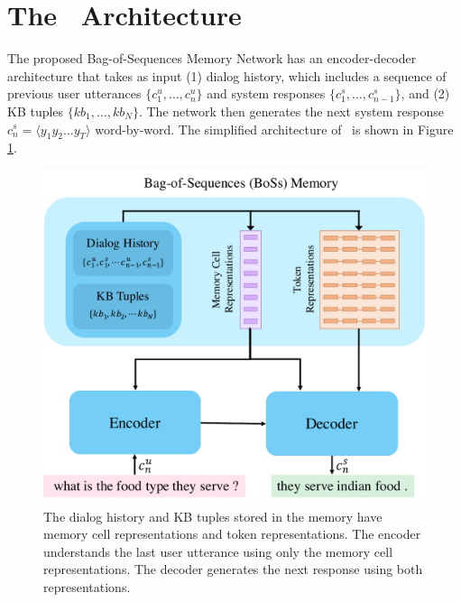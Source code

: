 \section{The \sys\ Architecture}
The proposed Bag-of-Sequences Memory Network has an encoder-decoder architecture that takes as input (1) dialog history, which includes a sequence of previous user utterances $\{c_1^u, \ldots, c_{n}^u\}$ and system responses $\{c_1^s, \ldots, c_{n-1}^s\}$, and (2) KB tuples $\{kb_1, \ldots, kb_{N}\}$. The network then generates the next system response $c_n^s=\langle y_1  y_2  \ldots  y_T \rangle$ word-by-word. The simplified architecture of \sys\ is shown in Figure \ref{fig:system}.

\begin{figure}[t]
\centering
\includegraphics[scale=0.45]{assets/paper_arch.pdf}
\caption{The dialog history and KB tuples stored in the memory have memory cell representations and token representations. The encoder understands the last user utterance using only the memory cell representations. The decoder generates the next response using both representations.}
\label{fig:system}
\end{figure}

